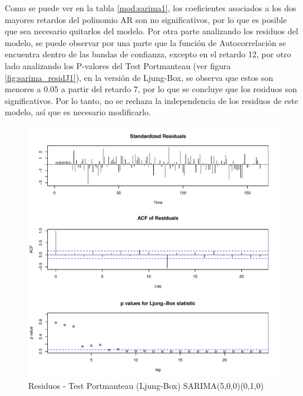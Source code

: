 \documentclass[12pt,oneside]{book}\usepackage[]{graphicx}\usepackage[]{color}
\makeatletter
\def\maxwidth{ %
  \ifdim\Gin@nat@width>\linewidth
    \linewidth
  \else
    \Gin@nat@width
  \fi
}
\newenvironment{knitrout}{}{} %
\theoremstyle{definition} %
\makeatother
\begin{document}
Como se puede ver en la tabla \ref{mod:sarima1}, los coeficientes asociados a los dos mayores retardos del polinomio AR son no significativos, por lo que es posible que sea necesario quitarlos del modelo. Por otra parte analizando los residuos del modelo, se puede observar por una parte que la función de Autocorrelación se encuentra dentro de las bandas de confianza, excepto en el retardo 12, por otro lado analizando los P-valores del Test Portmanteau (ver figura \ref{fig:sarima_residJ1}), en la versión de Ljung-Box, se observa que estos son menores a 0.05 a partir del retardo 7, por lo que se concluye que los residuos son significativos. Por lo tanto, no se rechaza la independencia de los residuos de este modelo, así que es necesario modificarlo.





\begin{knitrout}
\color{fgcolor}\begin{figure}[H]

{\centering \includegraphics[width=\maxwidth]{figure/unnamed-chunk-15-1} 

}

\caption{\label{fig:sarima_residJ1} Residuos - Test Portmanteau (Ljung-Box) SARIMA(5,0,0)(0,1,0)}\label{fig:unnamed-chunk-15}
\end{figure}


\end{knitrout}
\end{document}
